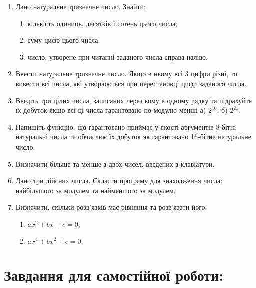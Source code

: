 \documentclass[a5paper,titlepage,openany,twoside,draft]{book_unv}%
\makeatletter
\newcommand{\xslalph}[1]{\expandafter\@xslalph\csname c@#1\endcsname}
\newcommand{\@xslalph}[1]{%
    \ifcase#1\or а\or б\or в\or г\or д\or e\or є\or ж\or з\or i%
    \or й\or к\or л\or м\or н\or о\or п\or р\or с\or т%
    \or у\or ф\or х\or ц\or ч\or ш\or ю\or я\or аа\or бб\or вв%
    \else\@ctrerr\fi%
}
\makeatother
\begin{document}
\begin{enumerate}
\def\labelenumi{\arabic{enumi})}
\item
Дано натуральне тризначне число. Знайти:
  \begin{enumerate}[label=\xslalph*)]
\item кількість одиниць, десятків і сотень цього числа;
\item суму цифр цього числа;
\item число, утворене при читанні заданого числа справа наліво.
\end{enumerate}

\item
Ввести натуральне тризначне число. Якщо в ньому всі 3 цифри різні, то
вивести всі числа, які утворюються при перестановці цифр заданого числа.
\item
Введіть три цілих числа, записаних через кому в одному рядку та
підрахуйте їх добуток якщо всі ці числа гарантовано по модулю менші а)
\(2^{10}\); б) \(2^{21}\).

\item
Напишіть функцію, що гарантовано приймає у якості аргументів 8-бітні
натуральні числа та обчислює їх добуток як гарантовано 16-бітне
натуральне число.
\item
Визначити більше та менше з двох чисел, введених з клавіатури.
\item
Дано три дійсних числа. Скласти програму для знаходження числа:
найбільшого за модулем та найменшого за модулем.
\item
Визначити, скільки розв'язків має рівняння та розв'язати його:
  \begin{multicols}{2}
  \begin{enumerate}[label=\xslalph*)]
\item \(ax^{2} + bx + c = 0\);
\item \(ax^{4} + bx^{2} + c = 0\).
  \end{enumerate}
  \end{multicols}

\end{enumerate}

\section{Завдання для самостійної роботи:}
\end{document}
